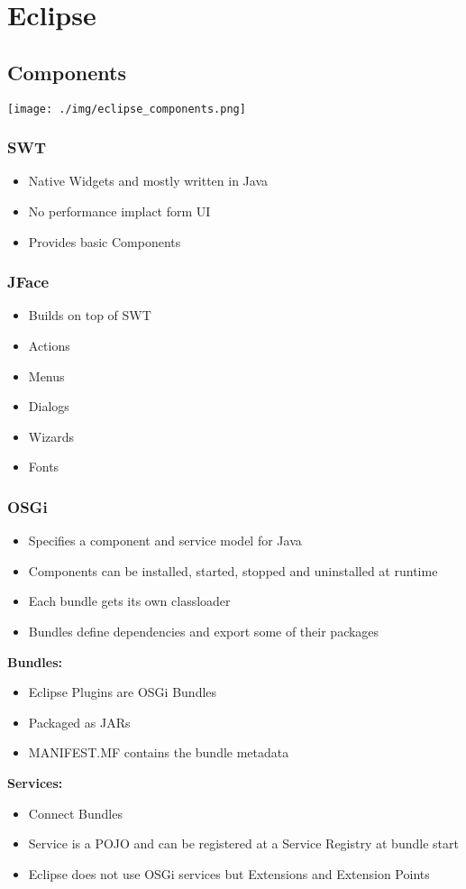 
\section{Eclipse}
\subsection{Components}
\texttt{[image: ./img/eclipse\_components.png]}
\subsubsection{SWT}
\begin{itemize}
    \item Native Widgets and mostly written in Java
    \item No performance implact form UI
    \item Provides basic Components
\end{itemize}
\subsubsection{JFace}
\begin{itemize}
    \item Builds on top of SWT 
    \item Actions 
    \item Menus 
    \item Dialogs 
    \item Wizards 
    \item Fonts 
\end{itemize}
\subsubsection{OSGi}
\begin{itemize}
    \item Specifies a component and service model for Java
    \item Components can be installed, started, stopped and uninstalled at runtime 
    \item Each bundle gets its own classloader
    \item Bundles define dependencies and export some of their packages
\end{itemize}
\textbf{Bundles:}
\begin{itemize}
    \item Eclipse Plugins are OSGi Bundles
    \item Packaged as JARs
    \item MANIFEST.MF contains the bundle metadata
\end{itemize}
\textbf{Services:}
\begin{itemize}
    \item Connect Bundles
    \item Service is a POJO and can be registered at a Service Registry at bundle start
    \item Eclipse does not use OSGi services but Extensions and Extension Points
\end{itemize}

